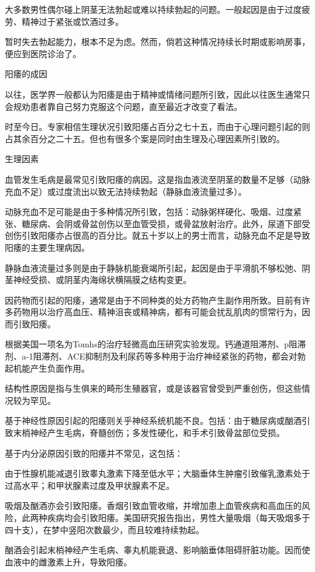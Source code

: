 \documentclass[12pt,UTF8]{ctexbook}
\begin{document}
大多数男性偶尔碰上阴茎无法勃起或难以持续勃起的问题。一般起因是由于过度疲劳、精神过于紧张或饮酒过多。

暂时失去勃起能力，根本不足为虑。然而，倘若这种情况持续长时期或影响房事，便应到医院诊治了。





阳痿的成因


以往，医学界一般都认为阳痿是由于精神或情绪问题所引致，因此以往医生通常只会规劝患者靠自己努力克服这个问题，直至最近才改变了看法。

时至今日。专家相信生理状况引致阳痿占百分之七十五，而由于心理问题引起的则占其余百分之二十五。但也有很多个案是同时由生理及心理因素所引致的。

生理因素

血管发生毛病是最常见引致阳痿的病因。这是指血液流至阴茎的数量不足够（动脉充血不足）或过度流出以致无法持续勃起（静脉血液流量过多）。

动脉充血不足可能是由于多种情况所引致，包括：动脉粥样硬化、吸烟、过度紧张、糖尿病、会阴或骨盆创伤以至血管受损，或骨盆放射治疗。此外，尿道下部受创伤引致阳痿亦占很高的百分比。就五十岁以上的男士而言，动脉充血不足是导致阳痿的主要生理病因。

静脉血液流量过多则是由于静脉机能衰竭所引起，起因是由于平滑肌不够松弛、阴茎神经受损、或阴茎内海绵状横隔膜之结构变更。

因药物而引起的阳痿，通常是由于不同种类的处方药物产生副作用所致。目前有许多药物用以治疗高血压、精神沮丧或精神病，都有可能会扰乱肌肉的惯常行为，因而引致阳痿。

根据美国一项名为Tomhs的治疗轻微高血压研究实验发现。钙通道阻滞剂、p阻滞剂、a-1阻滞剂、ACE抑制剂及利尿药等多种用于治疗神经紧张的药物，都会对勃起机能产生负面作用。

结构性原因是指与生俱来的畸形生殖器官，或是该器官曾受到严重创伤，但这些情况较为罕见。

基于神经性原因引起的阳痿则关乎神经系统机能不良。包括：由于糖尿病或酗酒引致末梢神经产生毛病，脊髓创伤；多发性硬化，和手术引致骨盆部位受损。

基于内分泌原因引致的阳痿并不常见，这包括：

由于性腺机能减退引致睾丸激素下降至低水平；大脑垂体生肿瘤引致催乳激素处于过高水平；和甲状腺素过度及甲状腺素不足。

吸烟及酗酒亦会引致阳痿。香烟引致血管收缩，并增加患上血管疾病和高血压的风险，此两种疾病均会引致阳痿。美国研究报告指出，男性大量吸烟（每天吸烟多于四十支），在梦中竖阳次数最少，而且较难持续勃起。

酗酒会引起末梢神经产生毛病、睾丸机能衰退、影响脑垂体阻碍肝脏功能。因而使血液中的雌激素上升，导致阳痿。
\end{document}

